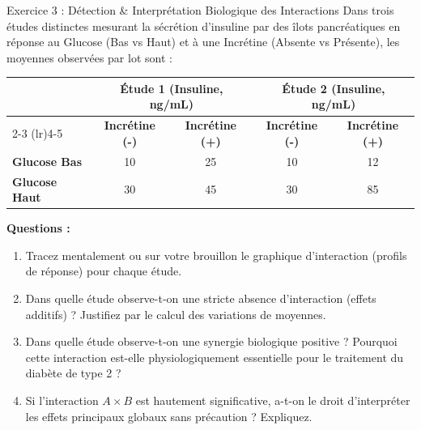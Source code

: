 \documentclass[11pt,a4paper]{article}
\begin{document}
\begin{exercicebox}{Exercice 3 : Détection \& Interprétation Biologique des Interactions}
Dans trois études distinctes mesurant la sécrétion d'insuline par des îlots pancréatiques en réponse au Glucose (Bas vs Haut) et à une Incrétine (Absente vs Présente), les moyennes observées par lot sont :

\begin{center}
  \small
  \begin{tabular}{lcccc}
    \toprule
    & \multicolumn{2}{c}{\textbf{Étude 1 (Insuline, ng/mL)}} & \multicolumn{2}{c}{\textbf{Étude 2 (Insuline, ng/mL)}} \\
    \cmidrule(lr){2-3} \cmidrule(lr){4-5}
    & \textbf{Incrétine (-)} & \textbf{Incrétine (+)} & \textbf{Incrétine (-)} & \textbf{Incrétine (+)} \\
    \midrule
    \textbf{Glucose Bas}  & 10 & 25 & 10 & 12 \\
    \textbf{Glucose Haut} & 30 & 45 & 30 & 85 \\
    \bottomrule
  \end{tabular}
\end{center}

\textbf{Questions :}
\begin{enumerate}[label=\textbf{\alph*.}]
  \item Tracez mentalement ou sur votre brouillon le graphique d'interaction (profils de réponse) pour chaque étude.
  \item Dans quelle étude observe-t-on une stricte absence d'interaction (effets additifs) ? Justifiez par le calcul des variations de moyennes.
  \item Dans quelle étude observe-t-on une synergie biologique positive ? Pourquoi cette interaction est-elle physiologiquement essentielle pour le traitement du diabète de type 2 ?
  \item Si l'interaction $A \times B$ est hautement significative, a-t-on le droit d'interpréter les effets principaux globaux sans précaution ? Expliquez.
\end{enumerate}
\end{exercicebox}
\end{document}
